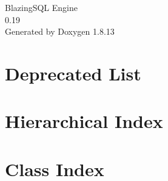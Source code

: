 \documentclass[twoside]{book}
\newcommand{\+}{\discretionary{\mbox{\scriptsize$\hookleftarrow$}}{}{}}
\newcommand{\clearemptydoublepage}{%
  \newpage{\pagestyle{empty}\cleardoublepage}%
}
\begin{document}
\hypersetup{pageanchor=false,
             bookmarksnumbered=true,
             pdfencoding=unicode
            }
\begin{titlepage}
\vspace*{7cm}
\begin{center}%
{\Large Blazing\+S\+QL Engine \\[1ex]\large 0.\+19 }\\
\vspace*{1cm}
{\large Generated by Doxygen 1.8.13}\\
\end{center}
\end{titlepage}
\clearemptydoublepage
{}
\tableofcontents
\clearemptydoublepage
{}
\hypersetup{pageanchor=true}

\chapter{Deprecated List}
\label{deprecated}

\chapter{Hierarchical Index}

\chapter{Class Index}

\end{document}
